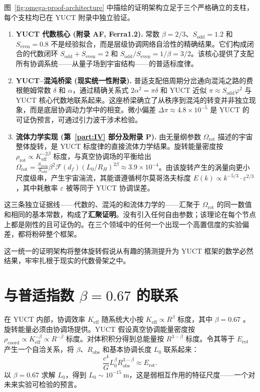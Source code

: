 \documentclass[11pt,a4paper]{article}
\newcommand{\Keff}{K_{\mathrm{eff}}}
\begin{document}
	图~\ref{fig:omega-proof-architecture} 中描绘的证明架构立足于三个严格确立的支柱，每个支柱均已在 YUCT 附录中独立验证。
	
	\begin{enumerate}
		\item \textbf{YUCT 代数核心 (附录 AF, Ferra1.2).} 常数 \(\beta = 2/3\)、\(S_{\mathrm{odd}}=1.2\) 和 \(S_{\mathrm{even}}=0.8\) 不是经验拟合，而是层级协调网络自洽性的精确结果。它们构成闭合的代数闭环 \(S_{\mathrm{odd}}+S_{\mathrm{even}}=2\) 和 \(S_{\mathrm{odd}}/S_{\mathrm{even}} = 1/\beta = 3/2\)。该核心提供了支配所有协调系统——从量子场到宇宙结构——的普适标度律。
		
		\item \textbf{YUCT–混沌桥梁 (现实统一性附录).} 普适支配倍周期分岔通向混沌之路的费根鲍姆常数 \(\delta\) 和 \(\alpha\)，通过精确关系式 \(2\alpha^2 = \pi\delta\) 和 YUCT 近似 \(\pi \approx S_{\mathrm{odd}}\varphi^2\) 与 YUCT 核心代数地联系起来。这座桥梁确立了从秩序到混沌的转变并非独立现象，而是底层协调动力学中的相变。微小偏差 \(\Delta\pi \approx 4.8\times10^{-5}\) 是 YUCT 的可证伪预言，可通过引力波干涉术检验。
		
		\item \textbf{流体力学实现 (第~\ref{part:IV} 部分及附录 P).} 由无量纲参数 \(\Omega_{\mathrm{rot}}\) 描述的宇宙整体旋转，是 YUCT 标度律的直接流体力学结果。旋转能量密度按 \(\rho_{\mathrm{rot}} \propto K_{\mathrm{eff}}^{-2\beta}\) 标度，与真空协调场的平衡给出 \(\Omega_{\mathrm{rot}} = \frac{S_{\mathrm{even}}}{S_{\mathrm{odd}}} \beta^2 \mathcal{F}(d_f) (L_0/R_H)^{2\beta} \approx 3.9\times10^{-4}\)。由该旋转产生的涡量向更小尺度级串，产生宇宙湍流，其能谱遵循柯尔莫哥洛夫标度 \(E(k) \propto k^{-5/3} \cdot \varepsilon^{2/3}\)，其中耗散率 \(\varepsilon\) 被等同于 YUCT 协调误差。
	\end{enumerate}
	
	这三条独立证据线——代数的、混沌的和流体力学的——汇聚于 \(\Omega_{\mathrm{rot}}\) 的同一数值和相同的基本常数，构成了\textbf{汇聚证明}。没有引入任何自由参数；该理论在每个节点上都是刚性的且可证伪的。在三个领域中的任何一个出现一个高置信度的实验偏差，都将粉碎整个框架。
	
	这一统一的证明架构将整体旋转假说从有趣的猜测提升为 YUCT 框架的数学必然结果，牢牢扎根于现实的代数骨架之中。
	
	\section{与普适指数 \(\beta = 0.67\) 的联系}
	
	在 YUCT 内部，协调效率 \(\Keff\) 随系统大小按 \(\Keff \propto R^{\beta}\) 标度，其中 \(\beta = 0.67\) \cite{AppendixL}。旋转能量必须由协调场提供。YUCT 假设真空协调能量密度按 \(\rho_{\text{coord}} \propto \Keff^{-\beta} \propto R^{-\beta}\) 标度。对体积积分得到总能量按 \(R^{3-\beta}\) 标度。令其等于 \(E_{\text{rot}}\) 产生一个自洽关系，将 \(\beta\)、\(R_{\text{obs}}\) 和基本协调长度 \(L_0\) 联系起来：
	\begin{equation}
		\frac{c^4}{G} L_0^{\beta} R_{\text{obs}}^{3-\beta} \approx E_{\text{rot}}.
	\end{equation}
	以 \(\beta = 0.67\) 求解 \(L_0\)，得到 \(L_0 \sim 10^{-15}\ \text{m}\)，这是弱相互作用的特征尺度——一个对未来实验可检验的预言。
	
\end{document}
